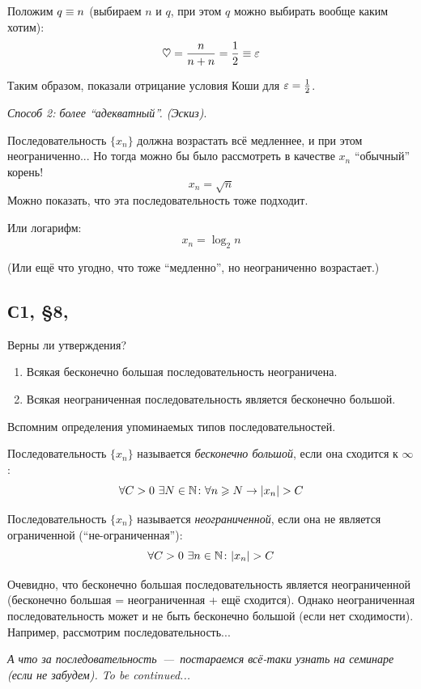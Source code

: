 \documentclass[a4paper,12pt]{article}
\begin{document}
\begin{solution}
    Положим $q \hm\equiv n$ (выбираем $n$ и $q$, при этом $q$ можно выбирать вообще каким хотим):
    \[
      \heartsuit = \frac{n}{n + n} = \frac{1}{2} \equiv \varepsilon
    \]
    
    Таким образом, показали отрицание условия Коши для $\eps \hm= \frac{1}{2}$.
    
    \medskip
    
    \emph{Способ 2: более ``адекватный''. (Эскиз)}.
    
    Последовательность $\{x_n\}$ должна возрастать всё медленнее, и при этом неограниченно...
    Но тогда можно бы было рассмотреть в качестве $x_n$ ``обычный'' корень!
    \[
      x_n = \sqrt{n}
    \]
    Можно показать, что эта последовательность тоже подходит.
    
    Или логарифм:
    \[
      x_n = \log_2 n
    \]
    
    (Или ещё что угодно, что тоже ``медленно'', но неограниченно возрастает.)
  \end{solution}
  
  
  \subsection{С1, \S 8, }
  
  Верны ли утверждения?
  \begin{enumerate}
    \item Всякая бесконечно большая последовательность неограничена.  %
    \item Всякая неограниченная последовательность является бесконечно большой.
  \end{enumerate}
  
  \begin{solution}
    Вспомним определения упоминаемых типов последовательностей.
    
    Последовательность $\{x_n\}$ называется \emph{бесконечно большой}, если она сходится к $\infty$:
    \[
      \forall C > 0\ \exists N \in \mathbb N\colon \forall n \geqslant N \to |x_n| > C
    \]
    
    Последовательность $\{x_n\}$ называется \emph{неограниченной}, если она не является ограниченной (``не-ограниченная''):
    \[
      \forall C > 0\ \exists n \in \NN\colon |x_n| > C
    \]
    
    Очевидно, что бесконечно большая последовательность является неограниченной (бесконечно большая = неограниченная + ещё сходится).
    Однако неограниченная последовательность может и не быть бесконечно большой (если нет сходимости).
    Например, рассмотрим последовательность...
    
    \emph{
      А что за последовательность~---~постараемся всё-таки узнать на семинаре (если не забудем).
      To be continued...
    }
  \end{solution}
  
\end{document}

